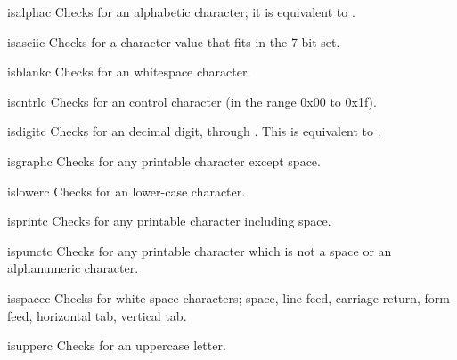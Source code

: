 \begin{funcdesc}{isalpha}{c}
Checks for an \ASCII{} alphabetic character; it is equivalent to
.
\end{funcdesc}

\begin{funcdesc}{isascii}{c}
Checks for a character value that fits in the 7-bit \ASCII{} set.
\end{funcdesc}

\begin{funcdesc}{isblank}{c}
Checks for an \ASCII{} whitespace character.
\end{funcdesc}

\begin{funcdesc}{iscntrl}{c}
Checks for an \ASCII{} control character (in the range 0x00 to 0x1f).
\end{funcdesc}

\begin{funcdesc}{isdigit}{c}
Checks for an \ASCII{} decimal digit,  through
.  This is equivalent to .
\end{funcdesc}

\begin{funcdesc}{isgraph}{c}
Checks for \ASCII{} any printable character except space.
\end{funcdesc}

\begin{funcdesc}{islower}{c}
Checks for an \ASCII{} lower-case character.
\end{funcdesc}

\begin{funcdesc}{isprint}{c}
Checks for any \ASCII{} printable character including space.
\end{funcdesc}

\begin{funcdesc}{ispunct}{c}
Checks for any printable \ASCII{} character which is not a space or an
alphanumeric character.
\end{funcdesc}

\begin{funcdesc}{isspace}{c}
Checks for \ASCII{} white-space characters; space, line feed,
carriage return, form feed, horizontal tab, vertical tab.
\end{funcdesc}

\begin{funcdesc}{isupper}{c}
Checks for an \ASCII{} uppercase letter.
\end{funcdesc}

